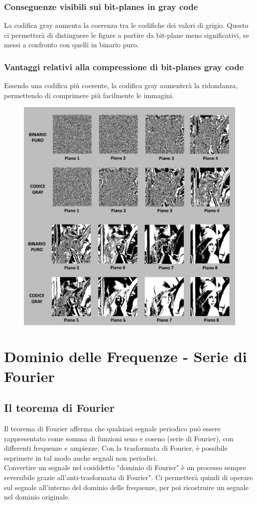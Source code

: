 \documentclass{report}
\begin{document}
	\newpage
		
	\subsection{Conseguenze visibili sui bit-planes in gray code}
	La codifica gray aumenta la coerenza tra le codifiche dei valori di grigio. Questo ci permetterà di distinguere le figure a partire da bit-plane meno significativi, se messi a confronto con quelli in binario puro.
		
	\subsection{Vantaggi relativi alla compressione di bit-planes gray code}
	Essendo una codifica più coerente, la codifica gray aumenterà la ridondanza, permettendo di comprimere più facilmente le immagini.
		
	\begin{figure}[htp]
		\centering
		\includegraphics[width=1\linewidth]{grayvspure.png}
	\end{figure}
	\chapter{Dominio delle Frequenze - Serie di Fourier}
	\section{Il teorema di Fourier}
	Il teorema di Fourier afferma che qualsiasi segnale periodico può essere rappresentato come somma di funzioni seno e coseno (serie di Fourier), con differenti frequenze e ampiezze. Con la trasformata di Fourier, è possibile esprimere in tal modo anche segnali non periodici. \\
	Convertire un segnale nel cosiddetto "dominio di Fourier" è un processo sempre reversibile grazie all'anti-trasformata di Fourier". Ci permetterà quindi di operare sul segnale all'interno del dominio delle frequenze, per poi ricostruire un segnale nel dominio originale.
\end{document}
